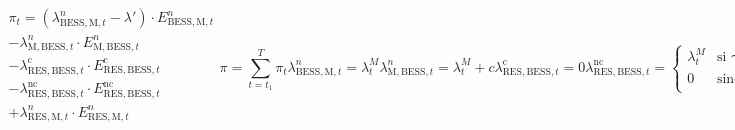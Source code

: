 \begin{subequations}%
  \label{eq:beneficio}

  \begin{equation}
    \begin{split}
      \pi_{t}
      = (\lambda^{n}_{\text{BESS}, \text{M}, t} - \lambda')
      \cdot E^{n}_{\text{BESS}, \text{M}, t}\\
      - \lambda^{n}_{\text{M}, \text{BESS}, t}
      \cdot E^{n}_{\text{M}, \text{BESS}, t}\\
      - \lambda^{\text{c}}_{\text{RES}, \text{BESS}, t}
      \cdot E^{\text{c}}_{\text{RES}, \text{BESS}, t}\\
      - \lambda^{\text{nc}}_{\text{RES}, \text{BESS}, t}
      \cdot E^{\text{nc}}_{\text{RES}, \text{BESS}, t}\\
      + \lambda^{n}_{\text{RES}, \text{M}, t}
      \cdot E^{n}_{\text{RES}, \text{M}, t}\\
    \end{split}
  \end{equation}

  \begin{equation}
    \pi = \sum_{t = t_{1}}^{T} \pi_{t}
  \end{equation}

  \begin{equation}
    \lambda^{n}_{\text{BESS}, \text{M}, t} = \lambda^{M}_{t}
  \end{equation}

  \begin{equation}
    \lambda^{n}_{\text{M}, \text{BESS}, t} = \lambda^{M}_{t} + c
  \end{equation}

  \begin{equation}
    \lambda^{\text{c}}_{\text{RES}, \text{BESS}, t} = 0
  \end{equation}

  \begin{equation}
    \lambda^{\text{nc}}_{\text{RES}, \text{BESS}, t} =
    \begin{cases}
      \lambda^{M}_{t} & \text{si } \gamma \land \lambda^{M}_{t} \ge \lambda^{O}_{\text{RES}, t} \\
      0               & \text{sino}                                                             \\
    \end{cases}
  \end{equation}

  \begin{equation}
    \lambda^{n}_{\text{RES}, \text{M}, t} =
    \begin{cases}
      \lambda^{M}_{t} & \text{si } \lambda^{M}_{t} \ge \lambda^{O}_{\text{RES}, t} \\
      0               & \text{sino}                                                \\
    \end{cases}
  \end{equation}

\end{subequations}

